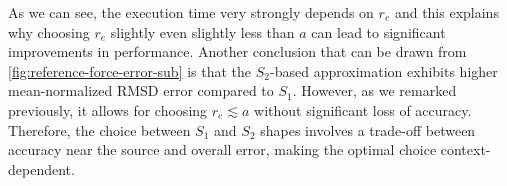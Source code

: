 As we can see, the execution time very strongly depends on $r_e$ and this explains why choosing $r_e$ slightly even slightly less than $a$ can lead to significant improvements in performance.
Another conclusion that can be drawn from \autoref{fig:reference-force-error-sub} is that the \( S_2 \)-based approximation exhibits higher mean-normalized RMSD error compared to \( S_1 \).
However, as we remarked previously, it allows for choosing $r_e \lesssim a$ without significant loss of accuracy.
Therefore, the choice between \( S_1 \) and \( S_2 \) shapes involves a trade-off between accuracy near the source and overall error, making the optimal choice context-dependent.

